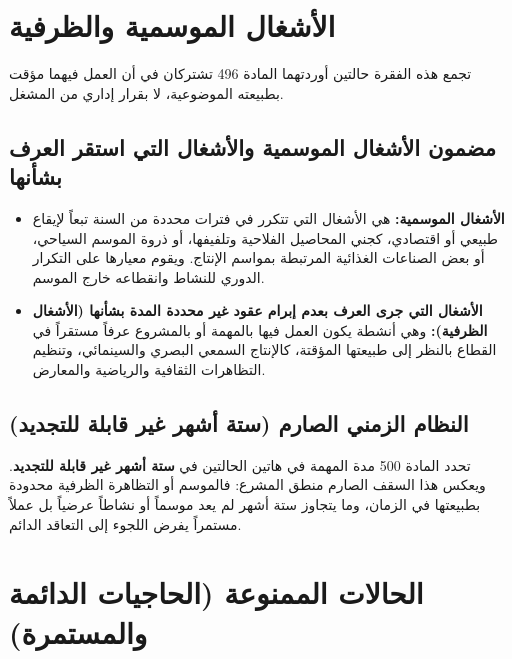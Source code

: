\section{الأشغال الموسمية والظرفية}

تجمع هذه الفقرة حالتين أوردتهما المادة \textenglish{496} تشتركان في أن العمل فيهما مؤقت بطبيعته الموضوعية، لا بقرار إداري من المشغل.

\subsection{مضمون الأشغال الموسمية والأشغال التي استقر العرف بشأنها}
\begin{itemize}[leftmargin=*, itemsep=6pt]
    \item \textbf{الأشغال الموسمية:} هي الأشغال التي تتكرر في فترات محددة من السنة تبعاً لإيقاع طبيعي أو اقتصادي، كجني المحاصيل الفلاحية وتلفيفها، أو ذروة الموسم السياحي، أو بعض الصناعات الغذائية المرتبطة بمواسم الإنتاج. ويقوم معيارها على التكرار الدوري للنشاط وانقطاعه خارج الموسم.
    \item \textbf{الأشغال التي جرى العرف بعدم إبرام عقود غير محددة المدة بشأنها (الأشغال الظرفية):} وهي أنشطة يكون العمل فيها بالمهمة أو بالمشروع عرفاً مستقراً في القطاع بالنظر إلى طبيعتها المؤقتة، كالإنتاج السمعي البصري والسينمائي، وتنظيم التظاهرات الثقافية والرياضية والمعارض.
\end{itemize}

\subsection{النظام الزمني الصارم (ستة أشهر غير قابلة للتجديد)}
تحدد المادة \textenglish{500} مدة المهمة في هاتين الحالتين في \textbf{ستة أشهر غير قابلة للتجديد}. ويعكس هذا السقف الصارم منطق المشرع: فالموسم أو التظاهرة الظرفية محدودة بطبيعتها في الزمان، وما يتجاوز ستة أشهر لم يعد موسماً أو نشاطاً عرضياً بل عملاً مستمراً يفرض اللجوء إلى التعاقد الدائم.

\section{الحالات الممنوعة (الحاجيات الدائمة والمستمرة)}

